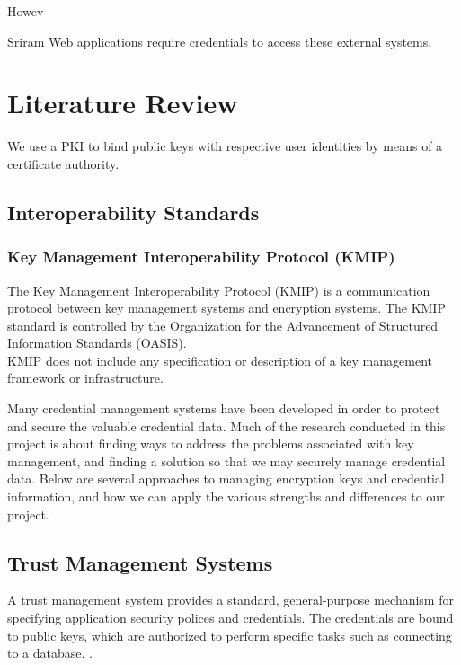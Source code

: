 \documentclass[11pt, a4paper, twoside, openany, notitlepage]{report}
\begin{document}
Howev

Sriram
Web applications require credentials to access these external systems.  


\makeblankpage





\chapter{Literature Review}






We use a PKI to bind public keys with respective user identities by means of a certificate authority. 

\section{Interoperability Standards}
\subsection{Key Management Interoperability Protocol (KMIP)}
The Key Management Interoperability Protocol (KMIP) is a communication protocol between key management systems and encryption systems. The KMIP standard is controlled by the Organization for the Advancement of Structured Information Standards (OASIS). \\

KMIP does not include any specification or description of a key management framework or infrastructure. 

Many credential management systems have been developed in order to protect and secure the valuable credential data. Much of the research conducted in this project is about finding ways to address the problems associated with key management, and finding a solution so that we may securely manage credential data. Below are several approaches to managing encryption keys and credential information, and how we can apply the various strengths and differences to our project. \\

\section*{Trust Management Systems}
A trust management system provides a standard, general-purpose mechanism for specifying application security polices and credentials.
The credentials are bound to public keys, which are authorized to perform specific tasks such as connecting to a database. \cite{blaze1999keynote}. \\
\end{document}
